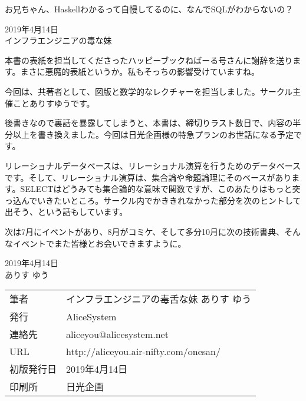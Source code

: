 お兄ちゃん、Haskellわかるって自慢してるのに、なんでSQLがわからないの？

\begin{flushright}
2019年4月14日 \\
インフラエンジニアの毒な妹 \\
\end{flushright}

本書の表紙を担当してくださったハッピーブックねばーる号さんに謝辞を送ります。まさに悪魔的表紙というか。私もそっちの影響受けていますね。

今回は、共著者として、図版と数学的なレクチャーを担当しました。サークル主催ことありすゆうです。

後書きなので裏話を暴露してしまうと、本書は、締切りラスト数日で、内容の半分以上を書き換えました。今回は日光企画様の特急プランのお世話になる予定です。

リレーショナルデータベースは、リレーショナル演算を行うためのデータベースです。そして、リレーショナル演算は、集合論や命題論理にそのベースがあります。SELECTはどうみても集合論的な意味で関数ですが、このあたりはもっと突っ込んでいきたいところ。サークル内でかききれなかった部分を次のヒントして出そう、という話もしています。

次は7月にイベントがあり、8月がコミケ、そして多分10月に次の技術書典、そんなイベントでまた皆様とお会いできますように。

\begin{flushright}
2019年4月14日 \\
ありす ゆう
\end{flushright}




\mbox{}
\newpage
\clearpage



\vspace*{\fill}
\begin{tabular}{ll} \toprule
筆者 & インフラエンジニアの毒舌な妹 ありす ゆう\\
発行 & AliceSystem \\
連絡先 & aliceyou@alicesystem.net \\
URL & http://aliceyou.air-nifty.com/onesan/ \\
初版発行日 & 2019年4月14日 \\
印刷所 & 日光企画  \\ \bottomrule
\end{tabular}